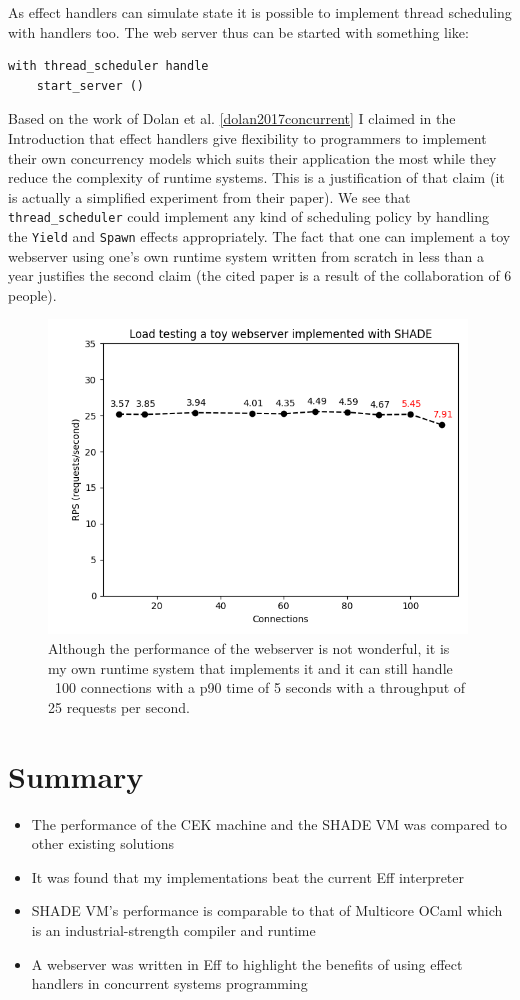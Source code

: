 \documentclass[class=article, crop=false]{standalone}
\begin{document}
As effect handlers can simulate state it is possible to implement thread
scheduling with handlers too. The web server
thus can be started with something like:
\begin{verbatim}
with thread_scheduler handle
    start_server ()
\end{verbatim}
Based on the work of Dolan et al. \autoref{dolan2017concurrent} I claimed in
the Introduction that effect handlers give flexibility to programmers to
implement their own concurrency models which suits their application the most
while they reduce the complexity of runtime systems. This is a justification of
that claim (it is actually a simplified experiment from their paper). We see
that \verb|thread_scheduler| could implement any kind of scheduling policy by
handling the \verb|Yield| and \verb|Spawn| effects appropriately. The fact that
one can implement a toy webserver using one's own runtime system written from
scratch in less than a year justifies the second claim (the cited paper is a
result of the collaboration of 6 people).

\begin{figure}
    \centering
    \includegraphics[width=30em]{eval_plots/webserver.png}
    \caption{Although the performance of the webserver is not wonderful, it is
    my own runtime system that implements it and it can still handle ~100
    connections with a p90 time of 5 seconds with a throughput of 25 requests
    per second.}
    \label{fig:hello-online-world}
\end{figure}

\section{Summary}

\begin{itemize}
    \item The performance of the CEK machine and the SHADE VM was compared to
    other existing solutions
    \item It was found that my implementations beat the current Eff interpreter
    \item SHADE VM's performance is comparable to that of Multicore OCaml which
    is an industrial-strength compiler and runtime
    \item A webserver was written in Eff to highlight the benefits of using
    effect handlers in concurrent systems programming
\end{itemize}
\end{document}
